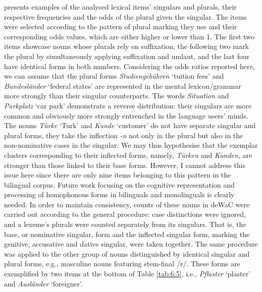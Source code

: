  presents examples of the analysed lexical items’ singulars and plurals, their respective frequencies and the odds of the plural given the singular. The items were selected according to the pattern of plural marking they use and their corresponding odds values, which are either higher or lower than 1. The first two items showcase nouns whose plurals rely on suffixation, the following two mark the plural by simultaneously applying suffixation and umlaut, and the last four have identical forms in both numbers. Considering the odds ratios reported here, we can assume that the plural forms \textit{Studiengebühren} `tuition fees' and \textit{Bundesländer} `federal states' are represented in the mental lexicon/grammar more strongly than their singular counterparts. The words \textit{Situation} and \textit{Parkplatz} `car park' demonstrate a reverse distribution: their singulars are more common and obviously more strongly entrenched in the language users' minds. The nouns \textit{Türke} `Turk' and \textit{Kunde} `customer' do not have separate singular and plural forms, they take the inflection \textit{-n} not only in the plural but also in the non-nominative cases in the singular. We may thus hypothesise that the exemplar clusters corresponding to their inflected forms, namely, \textit{Türken} and \textit{Kunden}, are stronger than those linked to their base forms. However, I cannot address this issue here since there are only nine items belonging to this pattern in the bilingual corpus. Future work focusing on the cognitive representation and processing of homophonous forms in bilinguals and monolinguals is clearly needed. In order to maintain consistency, counts of these nouns in deWaC were carried out according to the general procedure: case distinctions were ignored, and a lexeme’s plurals were counted separately from its singulars. That is, the base, or nominative singular, form and the inflected singular form, marking the genitive, accusative and dative singular, were taken together. The same procedure was applied to the other group of nouns distinguished by identical singular and plural forms, e.g., masculine nouns featuring stem-final /r/. These forms are exemplified by two items at the bottom of Table \ref{tab:6:5}, i.e., \textit{Pflaster} `plaster' and \textit{Ausländer} `foreigner'.

